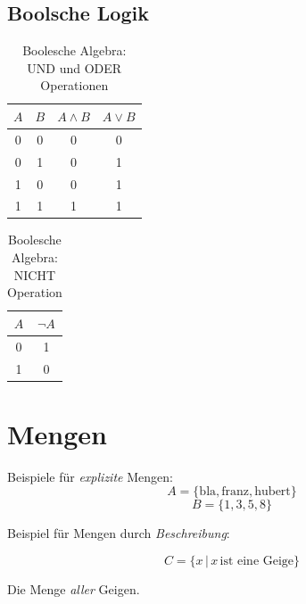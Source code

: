 
\subsection{Boolsche Logik}
\label{sec:bool}

\begin{table}[h!]
    \centering
    \begin{tabular}{|c|c|c|c|}
        \hline
        $A$ & $B$ & $A \land B$ & $A \lor B$ \\
        \hline
        0 & 0 & 0 & 0 \\
        0 & 1 & 0 & 1 \\
        1 & 0 & 0 & 1 \\
        1 & 1 & 1 & 1 \\
        \hline
    \end{tabular}
    \caption{Boolesche Algebra: UND und ODER Operationen}
\end{table}

\begin{table}[h!]
    \centering
    \begin{tabular}{|c|c|}
        \hline
        $A$ & $\neg A$ \\
        \hline
        0 & 1 \\
        1 & 0 \\
        \hline
    \end{tabular}
    \caption{Boolesche Algebra: NICHT Operation}
\end{table}


\section{Mengen}

Beispiele für \emph{explizite} Mengen:
$$ A = \{ \text{bla}, \text{franz}, \text{hubert} \} $$ 
$$ B = \{ 1, 3, 5, 8 \} $$ 

Beispiel für Mengen durch \emph{Beschreibung}:

$$ C = \{x \, | \, x \, \text{ist eine Geige} \} $$

Die Menge \emph{aller} Geigen.

